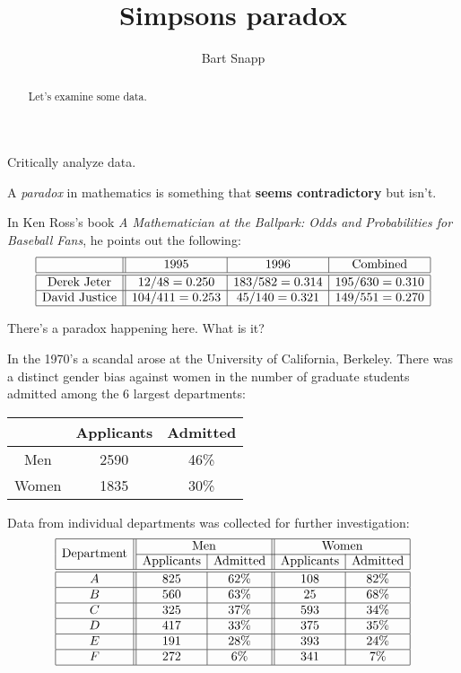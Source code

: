 \documentclass[nooutcomes,noauthor,hints]{ximera}
\title{Simpsons paradox}
\author{Bart Snapp}
\begin{document}
\begin{abstract}
  Let's examine some data.
\end{abstract}
\maketitle

\begin{listOutcomes}
\item Critically analyze data.
\end{listOutcomes}


A \textit{paradox} in mathematics is something that \textbf{seems
contradictory} but isn't.



In Ken Ross's book \textit{A Mathematician at the Ballpark: Odds and Probabilities for Baseball Fans}, he points out the following:
\[
\begin{array}{|c||c|c|c|} \hline
 & 1995 & 1996 & \text{Combined}\\ \hline\hline
\text{Derek Jeter} & 12/48 = 0.250 & 183/582 = 0.314 & 195/630 =0.310\\ \hline
\text{David Justice} & 104/411=0.253 & 45/140=0.321  & 149/551 = 0.270\\ \hline
\end{array}
\]

There's a paradox happening here. What is it?
\mynewpage

In the 1970's a scandal arose at the University of California,
Berkeley. There was a distinct gender bias against women in the number
of graduate students admitted among the 6 largest departments:
\begin{center}
\begin{tabular}{|c||c|c|} \hline
 & Applicants & Admitted \\ \hline\hline
Men & 2590 & 46\% \\ \hline
Women & 1835 & 30\% \\ \hline
\end{tabular}
\end{center}
Data from individual departments was collected for further investigation:
\[
\begin{array}{|c||c|c||c|c|} \hline
\multirow{2}{*}{\text{Department}} & \multicolumn{2}{c||}{\text{Men}} & \multicolumn{2}{c|}{\text{Women}}  \\\cline{2-5}
 & \text{Applicants} & \text{Admitted} & \text{Applicants} & \text{Admitted} \\\hline\hline
A & 825 & 62\% & 108 & 82\%\\ \hline
B & 560 & 63\% & 25 & 68\% \\ \hline
C & 325 & 37\% & 593 & 34\% \\ \hline
D & 417 & 33\% & 375 & 35\% \\ \hline
E & 191 & 28\% & 393 & 24\% \\ \hline
F & 272 & 6\% & 341 & 7\% \\ \hline
\end{array}
\]
\end{document}

